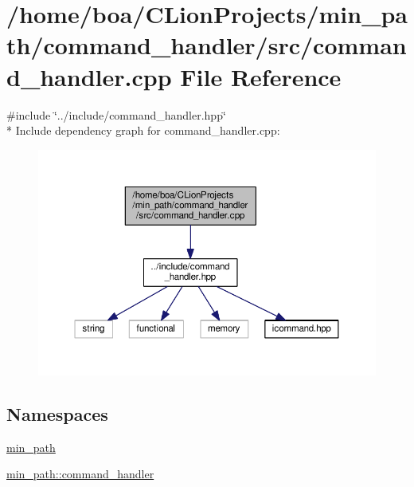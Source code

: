 \hypertarget{a00024}{}\section{/home/boa/\+C\+Lion\+Projects/min\+\_\+path/command\+\_\+handler/src/command\+\_\+handler.cpp File Reference}
\label{a00024}
{\ttfamily \#include \char`\"{}../include/command\+\_\+handler.\+hpp\char`\"{}}\\*
Include dependency graph for command\+\_\+handler.\+cpp\+:
\nopagebreak
\begin{figure}[H]
\begin{center}
\leavevmode
\includegraphics[width=350pt]{d4/d6d/a00055}
\end{center}
\end{figure}
\subsection*{Namespaces}
\begin{DoxyCompactItemize}
\item 
 \hyperlink{a00033}{min\+\_\+path}
\item 
 \hyperlink{a00035}{min\+\_\+path\+::command\+\_\+handler}
\end{DoxyCompactItemize}
